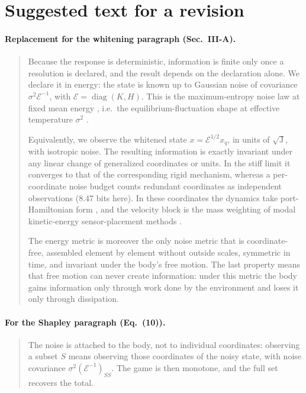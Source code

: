 \documentclass[11pt]{article}
\theoremstyle{definition}
\theoremstyle{remark}
\newcommand{\diag}{\operatorname{diag}}
\newcommand{\Em}{\mathcal{E}}         %
\begin{document}
\appendix
\section{Suggested text for a revision}
\label{app:text}

\paragraph{Replacement for the whitening paragraph (Sec.~III-A).}
\begin{quote}\small
Because the response is deterministic, information is finite only once a resolution is
declared, and the result depends on the declaration alone. We declare it in energy: the
state is known up to Gaussian noise of covariance $\sigma^2\Em^{-1}$, with
$\Em=\diag(K,H)$. This is the maximum-entropy noise law at fixed mean energy
\citep{jaynes1957information}, i.e.\ the equilibrium-fluctuation shape at effective
temperature $\sigma^2$ \citep{kubo1966fluctuation}.

Equivalently, we observe the whitened state $x=\Em^{1/2}x_q$, in units of
$\sqrt{\mathrm J}$, with isotropic noise. The resulting information is exactly invariant
under any linear change of generalized coordinates or units. In the stiff limit it
converges to that of the corresponding rigid mechanism, whereas a per-coordinate noise
budget counts redundant coordinates as independent observations (8.47 bits here). In these
coordinates the dynamics take port-Hamiltonian form \citep{vanderschaft2014port}, and the
velocity block is the mass weighting of modal kinetic-energy sensor-placement methods
\citep{li2007connection}.

The energy metric is moreover the only noise metric that is coordinate-free, assembled
element by element without outside scales, symmetric in time, and invariant under the
body's free motion. The last property means that free motion can never create
information: under this metric the body gains information only through work done by the
environment and loses it only through dissipation.
\end{quote}

\paragraph{For the Shapley paragraph (Eq.~(10)).}
\begin{quote}\small
The noise is attached to the body, not to individual coordinates: observing a subset $S$
means observing those coordinates of the noisy state, with noise covariance
$\sigma^2(\Em^{-1})_{SS}$. The game is then monotone, and the full set recovers the total.
\end{quote}
\end{document}
